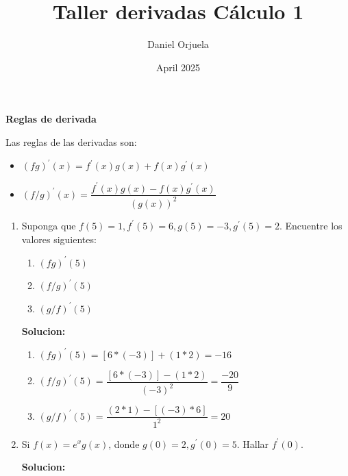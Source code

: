 \documentclass{article}
\title{Taller derivadas Cálculo 1}
\author{Daniel Orjuela}
\date{April 2025}
\begin{document}
\maketitle

\begin{center}
    \Large \textbf{Reglas de derivada}
\end{center}  
    Las reglas de las derivadas son:
    \begin{itemize}
        \item $(fg)^{\prime}(x) = f^{\prime}(x)g(x) + f(x)g^{\prime}(x)$
        \item $(f/g)^{\prime}(x) = \dfrac{f^{\prime}(x)g(x) - f(x)g^{\prime}(x)}{(g(x))^2}$
    \end{itemize}
\vspace{0.5em}

\begin{enumerate}[start=5, label=\textbf{\arabic*.}]
    \item Suponga que $f(5) = 1, f^{\prime}(5) = 6, g(5) = -3, g^{\prime}(5) = 2$. Encuentre los valores siguientes:
        \begin{enumerate}[label=\alph*)] %
            \item $(fg)^{\prime}(5)$
            \item $(f/g)^{\prime}(5)$
            \item $(g/f)^{\prime}(5)$
        \end{enumerate}
        \vspace{0.5em}
        
    \textbf{Solucion: }

    \begin{enumerate}[label=\alph*)] 
        \item $(fg)^{\prime}(5)= [6*(-3)] + (1*2) = -16$
        \item $(f/g)^{\prime}(5) = \dfrac {[6*(-3)] - (1*2)}{(-3)^2} = \dfrac{-20}{9}$
        \item $(g/f)^{\prime}(5) = \dfrac{(2*1) - [(-3)*6]}{1^2} = {20}$
        \vspace{0.5em}
    \end{enumerate}

    \item Si $f(x) = e^x g(x)$, donde $g(0) = 2, g^{\prime}(0) = 5$. Hallar $f^{\prime}(0)$.
    \vspace{0.5em}
    \vspace{0.5em}

    \textbf{Solucion: }


\end{enumerate}
\end{document}
